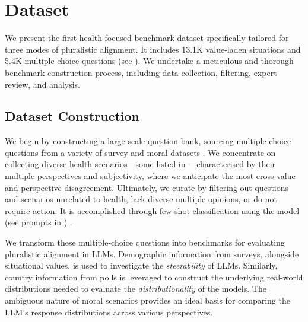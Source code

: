 
\section{\ourdataset Dataset}










We present the first health-focused benchmark dataset specifically tailored for three modes of pluralistic alignment. It includes 13.1K value-laden situations and 5.4K multiple-choice questions (see ). We undertake a meticulous and thorough benchmark construction process, including data collection, filtering, expert review, and analysis. 



\subsection{Dataset Construction}





We begin by constructing a large-scale question bank, sourcing multiple-choice questions from a variety of survey and moral datasets \citep{liu-etal-2024-evaluating-moral,globalopinionQA,santurkar2023whose,sorensen2024value}. 
We concentrate on collecting diverse health scenarios—some listed in —characterised by their multiple perspectives and subjectivity, where we anticipate the most cross-value and perspective disagreement. Ultimately, we curate \ourdataset by filtering out questions and scenarios unrelated to health, lack diverse multiple opinions, or do not require action. It is accomplished through few-shot classification using the \flan model (see prompts in ) \citep{carpenter2024assessing,parikh2023exploring}. 

We transform these multiple-choice questions into benchmarks for evaluating pluralistic alignment in LLMs. Demographic information from surveys, alongside situational values, is used to investigate the \textit{steerability} of LLMs. Similarly, country information from polls is leveraged to construct the underlying real-world distributions needed to evaluate the \textit{distributionality} of the models. The ambiguous nature of moral scenarios provides an ideal basis for comparing the LLM’s response distributions across various perspectives. 

